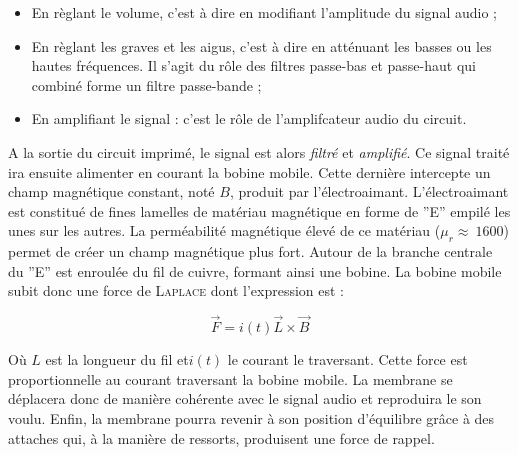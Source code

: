 \begin{itemize}
	\item En règlant le volume, c'est à dire en modifiant l'amplitude du signal audio ;
	\item En règlant les graves et les aigus, c'est à dire en atténuant les basses ou les hautes
	fréquences. Il s'agit du rôle des filtres passe-bas et passe-haut qui combiné forme un filtre 
	passe-bande ;
	\item En amplifiant le signal : c'est le rôle de l'amplifcateur audio du circuit.
\end{itemize}

A la sortie du circuit imprimé, le signal est alors \textit{filtré} et \textit{amplifié}.
Ce signal traité ira ensuite alimenter en courant la bobine mobile. Cette 
dernière intercepte un champ magnétique constant, noté $B$, produit par l'électroaimant.
L'électroaimant est constitué de fines lamelles de matériau magnétique en forme de ''E'' 
empilé les unes sur les autres. La perméabilité magnétique élevé de ce matériau
($\mu_r \approx \ 1600$) permet de créer un champ magnétique plus fort. Autour de la branche
centrale du ''E'' est enroulée du fil de cuivre, formant ainsi une bobine.
La bobine mobile subit donc une force de \textsc{Laplace} dont l'expression est :

$$\vec{F} = i(t)\vec{L}\times{\vec{B}}$$ 

Où $L$ est la longueur du fil et$i(t)$ le courant le traversant. Cette force est proportionnelle
au courant traversant
la bobine mobile. La membrane se déplacera donc de manière cohérente avec le signal audio
et reproduira le son voulu. Enfin, la membrane pourra revenir à son position d'équilibre
grâce à des attaches qui, à la manière de ressorts, produisent une force de rappel.

